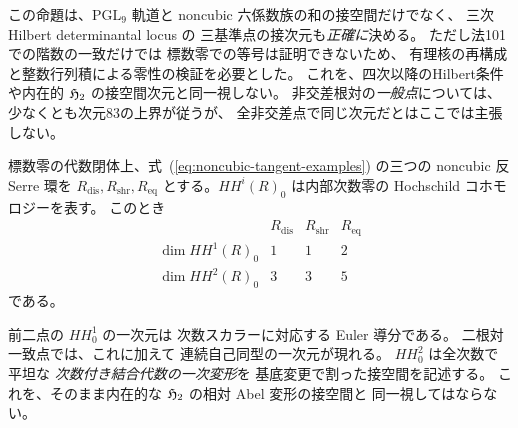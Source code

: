 \begin{remark}[接空間の正確な解釈]
この命題は、$\mathrm{PGL}_9$ 軌道と
noncubic 六係数族の和の接空間だけでなく、
三次 Hilbert determinantal locus の
三基準点の接次元も\emph{正確に}決める。
ただし法101での階数の一致だけでは
標数零での等号は証明できないため、
有理核の再構成と整数行列積による零性の検証を必要とした。
これを、四次以降のHilbert条件や内在的
$\mathfrak H_2$ の接空間次元と同一視しない。
非交差根対の\emph{一般点}については、
少なくとも次元83の上界が従うが、
全非交差点で同じ次元だとはここでは主張しない。
\end{remark}

\begin{theorem}
\label{thm:noncubic-hh01-hh2}
標数零の代数閉体上、式~(\ref{eq:noncubic-tangent-examples})
の三つの noncubic 反 Serre 環を
$R_{\mathrm{dis}},R_{\mathrm{shr}},R_{\mathrm{eq}}$
とする。$HH^i(R)_0$ は内部次数零の
Hochschild コホモロジーを表す。
このとき
\[
\begin{array}{c|ccc}
 &R_{\mathrm{dis}}&R_{\mathrm{shr}}&R_{\mathrm{eq}}\\ \hline
 \dim HH^1(R)_0 &1&1&2\\
 \dim HH^2(R)_0 &3&3&5
\end{array}
\tag{NC-HH}\label{eq:noncubic-hh-table}
\]
である。

前二点の $HH^1_0$ の一次元は
次数スカラーに対応する Euler 導分である。
二根対一致点では、これに加えて
連続自己同型の一次元が現れる。
$HH^2_0$ は全次数で平坦な
\emph{次数付き結合代数の一次変形}を
基底変更で割った接空間を記述する。
これを、そのまま内在的な
$\mathfrak H_2$ の相対 Abel 変形の接空間と
同一視してはならない。
\end{theorem}

